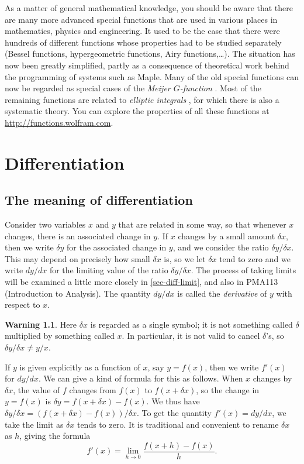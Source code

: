 \documentclass[a4paper]{book}
\newcommand{\PURPLE}[1]{{\color{purple}#1}}
\newcommand{\dl}        {\delta}
\newcommand{\xra}       {\xrightarrow}
\renewcommand{\:}{\colon}
\newcommand{\mathworld}[1]{}
\newcommand{\PMA}[1]{PMA#1}
\newcommand{\DEFN}[1]{\PURPLE{\emph{#1}}}
\theoremstyle{definition}
\newtheorem{warning}[theorem]{Warning}
\begin{document}
As a matter of general mathematical knowledge, you should be aware
that there are many more advanced special functions that are used in
various places in mathematics, physics and engineering.  It used to be
the case that there were hundreds of different functions whose
properties had to be studied separately (Bessel functions,
hypergeometric functions, Airy functions,\ldots).  The situation has
now been greatly simplified, partly as a consequence of theoretical
work behind the programming of systems such as Maple.  Many of the old
special functions can now be regarded as special cases of the
\DEFN{Meijer $G$-function} \mathworld{MeijerG-Function}.  Most of the
remaining functions are related to \DEFN{elliptic integrals}
\mathworld{EllipticIntegral}, for which there is also a systematic
theory.  You can explore the properties of all these functions at
\url{http://functions.wolfram.com}.

\chapter{Differentiation}
\label{chap-diff}

\section{The meaning of differentiation}
\label{sec-diff-meaning}

Consider two variables $x$ and $y$ that are related in some way, so
that whenever $x$ changes, there is an associated change in $y$.  If
$x$ changes by a small amount $\dl x$, then we write $\dl y$ for the
associated change in $y$, and we consider the ratio $\dl y/\dl x$.
This may depend on precisely how small $\dl x$ is, so we let $\dl x$
tend to zero and we write $dy/dx$ for the limiting value of the ratio
$\dl y/\dl x$.  The process of taking limits will be examined a little
more closely in \autoref{sec-diff-limit}, and also in \PMA{113}
(Introduction to Analysis).  The quantity $dy/dx$ is called the
\DEFN{derivative} of $y$ with respect to $x$.  

\begin{warning}
 Here $\dl x$ is regarded as a single symbol; it is not something
 called $\dl$ multiplied by something called $x$.  In particular, it
 is not valid to cancel $\dl$'s, so $\dl y/\dl x\neq y/x$.  \bigskip
\end{warning}

If $y$ is given explicitly as a function of $x$, say $y=f(x)$, then we
write $f'(x)$ for $dy/dx$.  We can give a kind of formula for this as
follows.  When $x$ changes by $\dl x$, the value of $f$ changes from
$f(x)$ to $f(x+\dl x)$, so the change in $y=f(x)$ is 
$\dl y=f(x+\dl x)-f(x)$.  We thus have 
$\dl y/\dl x=(f(x+\dl x)-f(x))/\dl x$.  To get the quantity
$f'(x)=dy/dx$, we take the limit as $\dl x$ tends to zero.  It is
traditional and convenient to rename $\dl x$ as $h$, giving the
formula 
\[ f'(x) = \lim_{h\xra{}0} \frac{f(x+h) - f(x)}{h}. \]
\end{document}
